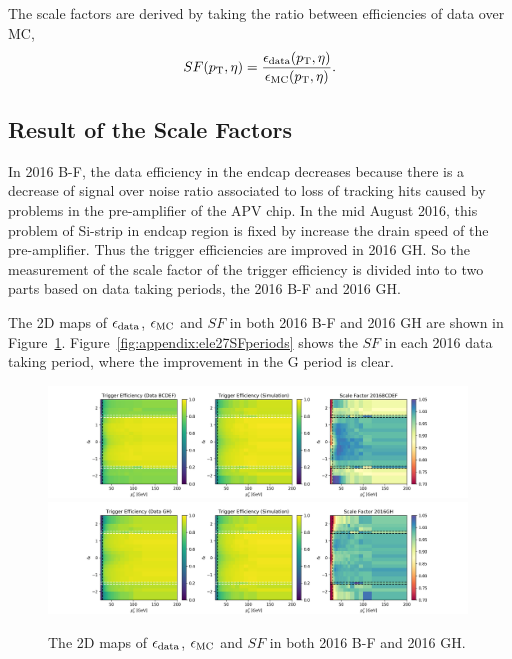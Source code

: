 \noindent The scale factors are derived by taking the ratio between efficiencies of data over MC,
\begin{equation}
SF (p_{\mathrm{T}}, \eta) = \frac{\epsilon_{\rm{data}} (p_{\mathrm{T}}, \eta) }{\epsilon_{\rm{MC}} (p_{\mathrm{T}}, \eta) }.
\end{equation}



\subsection{Result of the Scale Factors}

In 2016 B-F, the data efficiency in the endcap decreases because there is a decrease of signal over noise ratio associated 
to loss of	tracking hits caused by problems in the pre-amplifier of the APV chip. 
In the mid August 2016, this problem of Si-strip in endcap region is fixed by increase the drain speed of the pre-amplifier. Thus the 
trigger efficiencies are improved in 2016 GH. So the measurement of the scale factor of the trigger efficiency is divided into to
two parts based on data taking periods, the 2016 B-F and 2016 GH.

The 2D maps of $\epsilon_{\rm{data}}$, $\epsilon_{\rm{MC}}$ and $SF$ in both 2016 B-F and 2016 GH are shown in Figure~\ref{fig:appendix:ele27SF}. Figure~\ref{fig:appendix:ele27SFperiods} 
shows the $SF$ in each 2016 data taking period, where the improvement in the G period is clear.



\begin{figure}
    \centering
    \includegraphics[width=0.99\textwidth]{chapters/Appendix/sectionEleTrigger/figures/eff2d_BCDEF.png}
    \includegraphics[width=0.99\textwidth]{chapters/Appendix/sectionEleTrigger/figures/eff2d_GH.png}
    \caption{The 2D maps of $\epsilon_{\rm{data}}$, $\epsilon_{\rm{MC}}$ and $SF$ in both 2016 B-F and 2016 GH.}
    \label{fig:appendix:ele27SF}
\end{figure}



